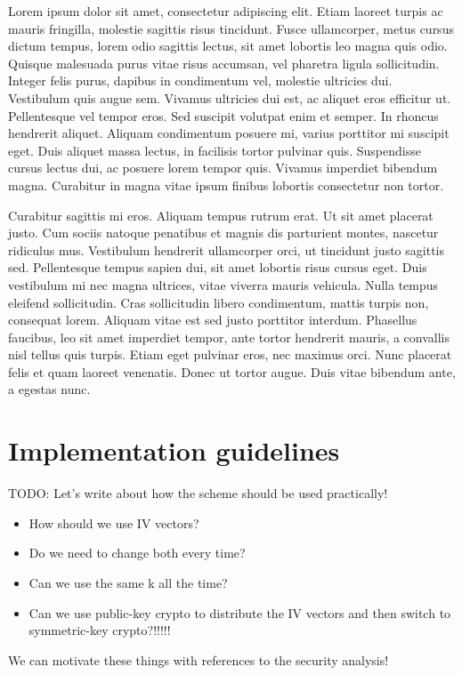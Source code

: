 \documentclass[conference]{IEEEtran}
\begin{document}
Lorem ipsum dolor sit amet, consectetur adipiscing elit. Etiam laoreet turpis ac mauris fringilla, molestie sagittis risus tincidunt. Fusce ullamcorper, metus cursus dictum tempus, lorem odio sagittis lectus, sit amet lobortis leo magna quis odio. Quisque malesuada purus vitae risus accumsan, vel pharetra ligula sollicitudin. Integer felis purus, dapibus in condimentum vel, molestie ultricies dui. Vestibulum quis augue sem. Vivamus ultricies dui est, ac aliquet eros efficitur ut. Pellentesque vel tempor eros. Sed suscipit volutpat enim et semper. In rhoncus hendrerit aliquet. Aliquam condimentum posuere mi, varius porttitor mi suscipit eget. Duis aliquet massa lectus, in facilisis tortor pulvinar quis. Suspendisse cursus lectus dui, ac posuere lorem tempor quis. Vivamus imperdiet bibendum magna. Curabitur in magna vitae ipsum finibus lobortis consectetur non tortor.

Curabitur sagittis mi eros. Aliquam tempus rutrum erat. Ut sit amet placerat justo. Cum sociis natoque penatibus et magnis dis parturient montes, nascetur ridiculus mus. Vestibulum hendrerit ullamcorper orci, ut tincidunt justo sagittis sed. Pellentesque tempus sapien dui, sit amet lobortis risus cursus eget. Duis vestibulum mi nec magna ultrices, vitae viverra mauris vehicula. Nulla tempus eleifend sollicitudin. Cras sollicitudin libero condimentum, mattis turpis non, consequat lorem. Aliquam vitae est sed justo porttitor interdum. Phasellus faucibus, leo sit amet imperdiet tempor, ante tortor hendrerit mauris, a convallis nisl tellus quis turpis. Etiam eget pulvinar eros, nec maximus orci. Nunc placerat felis et quam laoreet venenatis. Donec ut tortor augue. Duis vitae bibendum ante, a egestas nunc.

\section{Implementation guidelines}

TODO: Let’s write about how the scheme should be used practically!
\begin{itemize}
  \item How should we use IV vectors?
  \item Do we need to change both every time?
  \item Can we use the same k all the time?
  \item Can we use public-key crypto to distribute the IV vectors and then switch to symmetric-key crypto?!!!!!
\end{itemize}
We can motivate these things with references to the security analysis!
\end{document}
